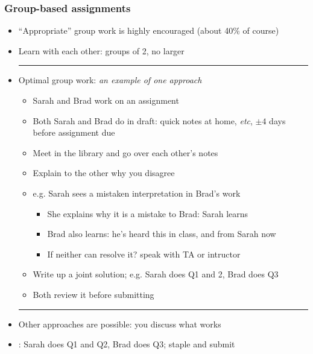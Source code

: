 \begin{frame}\frametitle{Group-based assignments}
	\begin{itemize}
		\item	``Appropriate'' group work is highly encouraged (about 40\% of course)
		\item	Learn with each other: groups of 2, no larger
		\hrule
		\item	Optimal group work: \emph{an example of one approach}
			\begin{itemize}
				\item	Sarah and Brad work on an assignment
				\item	Both Sarah and Brad do {} in draft: quick notes at home, \emph{etc}, $\pm 4$ days before assignment due
				\item	Meet in the library and go over each other's notes
				\item	Explain to the other why you disagree
				\item	e.g. Sarah sees a mistaken interpretation in Brad's work
				\begin{itemize}
					\item	She explains why it is a mistake to Brad: Sarah learns
					\item	Brad also learns: he's heard this in class, and from Sarah now
					\item	If neither can resolve it? speak with TA or intructor					
				\end{itemize}
				\item	Write up a joint solution; e.g. Sarah does Q1 and 2, Brad does Q3
				\item	Both review it before submitting
			\end{itemize}
		\hrule
		\item	Other approaches are possible: you discuss what works
		\item	\color{myOrange}{What doesn't work}: Sarah does Q1 and Q2, Brad does Q3; staple and submit
	\end{itemize}
\end{frame}

